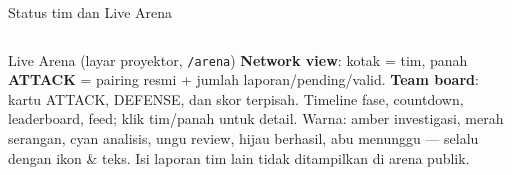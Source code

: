 \documentclass[aspectratio=169,10pt]{beamer}
\newcommand{\hl}[1]{\textcolor{cyanx}{\textbf{#1}}}
\begin{document}
\begin{frame}{Status tim dan Live Arena}
\begin{columns}[T,onlytextwidth]
\end{columns}
\vspace{0.6em}
\begin{block}{Live Arena (layar proyektor, \texttt{/arena})}
\footnotesize
\hl{Network view}: kotak = tim, panah \textcolor{redx}{\textbf{ATTACK}} = pairing resmi + jumlah laporan/pending/valid. \;
\hl{Team board}: kartu ATTACK, DEFENSE, dan skor terpisah. \;
Timeline fase, countdown, leaderboard, feed; klik tim/panah untuk detail. \;
Warna: \textcolor{amber}{amber} investigasi, \textcolor{redx}{merah} serangan, \textcolor{cyanx}{cyan} analisis, \textcolor{purplex}{ungu} review, \textcolor{greenx}{hijau} berhasil, \textcolor{greyx}{abu} menunggu --- selalu dengan ikon \& teks. Isi laporan tim lain tidak ditampilkan di arena publik.
\end{block}
\end{frame}
\end{document}
